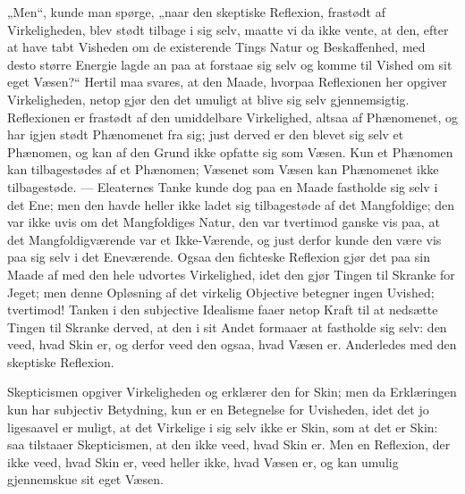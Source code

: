 \documentclass[12pt]{book}
\newcommand{\opage}[1]{\marginnote{\footnotesize\textit{[#1]}}}
\begin{document}
„Men“, kunde man spørge, „naar den skeptiske Reflexion, frastødt af Virkeligheden, blev stødt tilbage i sig selv, maatte vi da ikke vente, at den, efter at have tabt Visheden om de existerende Tings Natur og Beskaffenhed, med desto større Energie lagde an paa at forstaae sig selv og komme til Vished om sit eget Væsen?“ Hertil maa svares, at den Maade, hvorpaa Reflexionen her opgiver Virkeligheden, netop gjør den det umuligt at blive sig selv gjennemsigtig. Reflexionen er frastødt af den umiddelbare Virkelighed, altsaa af Phænomenet, og har igjen stødt Phænomenet fra sig; just derved er den blevet sig selv et Phænomen, og kan af den Grund ikke opfatte sig som Væsen. Kun et Phænomen kan tilbagestødes af et Phænomen; Væsenet som Væsen kan Phænomenet ikke tilbagestøde. --- Eleaternes Tanke kunde dog paa en Maade fastholde sig selv i det Ene; men den havde heller ikke ladet sig tilbagestøde af det Mangfoldige; den var ikke uvis om det Mangfoldiges Natur, den var tvertimod ganske vis paa, at det Mangfoldigværende var et Ikke-Værende, og just derfor kunde den være vis paa sig selv i det Eneværende. Ogsaa den fichteske Reflexion gjør det paa sin Maade af med den hele udvortes Virkelighed, idet den gjør Tingen til Skranke for Jeget; men denne Opløsning af det virkelig Objective
\opage{216}betegner ingen Uvished; tvertimod! Tanken i den subjective Idealisme faaer netop Kraft til at nedsætte Tingen til Skranke derved, at den i sit Andet formaaer at fastholde sig selv: den veed, hvad Skin er, og derfor veed den ogsaa, hvad Væsen er. Anderledes med den skeptiske Reflexion.

Skepticismen opgiver Virkeligheden og erklærer den for Skin; men da Erklæringen kun har subjectiv Betydning, kun er en Betegnelse for Uvisheden, idet det jo ligesaavel er muligt, at det Virkelige i sig selv ikke er Skin, som at det er Skin: saa tilstaaer Skepticismen, at den ikke veed, hvad Skin er. Men en Reflexion, der ikke veed, hvad Skin er, veed heller ikke, hvad Væsen er, og kan umulig gjennemskue sit eget Væsen.
\end{document}
